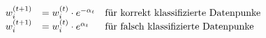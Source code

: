 \begin{align*}
    \begin{array}{l l l}
        w^{(t+1)}_i & = w^{(t)}_i \cdot e^{-\alpha_t} & \text{für korrekt klassifizierte Datenpunke} \\
        w^{(t+1)}_i & = w^{(t)}_i \cdot e^{\alpha_t}  & \text{für falsch klassifizierte Datenpunke}
    \end{array}
\end{align*}